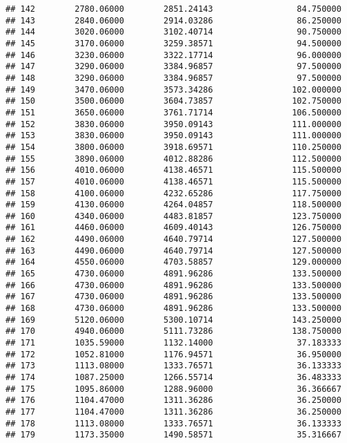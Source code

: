 \documentclass[]{article}
\begin{document}
\begin{verbatim}
## 142        2780.06000        2851.24143                 84.750000
## 143        2840.06000        2914.03286                 86.250000
## 144        3020.06000        3102.40714                 90.750000
## 145        3170.06000        3259.38571                 94.500000
## 146        3230.06000        3322.17714                 96.000000
## 147        3290.06000        3384.96857                 97.500000
## 148        3290.06000        3384.96857                 97.500000
## 149        3470.06000        3573.34286                102.000000
## 150        3500.06000        3604.73857                102.750000
## 151        3650.06000        3761.71714                106.500000
## 152        3830.06000        3950.09143                111.000000
## 153        3830.06000        3950.09143                111.000000
## 154        3800.06000        3918.69571                110.250000
## 155        3890.06000        4012.88286                112.500000
## 156        4010.06000        4138.46571                115.500000
## 157        4010.06000        4138.46571                115.500000
## 158        4100.06000        4232.65286                117.750000
## 159        4130.06000        4264.04857                118.500000
## 160        4340.06000        4483.81857                123.750000
## 161        4460.06000        4609.40143                126.750000
## 162        4490.06000        4640.79714                127.500000
## 163        4490.06000        4640.79714                127.500000
## 164        4550.06000        4703.58857                129.000000
## 165        4730.06000        4891.96286                133.500000
## 166        4730.06000        4891.96286                133.500000
## 167        4730.06000        4891.96286                133.500000
## 168        4730.06000        4891.96286                133.500000
## 169        5120.06000        5300.10714                143.250000
## 170        4940.06000        5111.73286                138.750000
## 171        1035.59000        1132.14000                 37.183333
## 172        1052.81000        1176.94571                 36.950000
## 173        1113.08000        1333.76571                 36.133333
## 174        1087.25000        1266.55714                 36.483333
## 175        1095.86000        1288.96000                 36.366667
## 176        1104.47000        1311.36286                 36.250000
## 177        1104.47000        1311.36286                 36.250000
## 178        1113.08000        1333.76571                 36.133333
## 179        1173.35000        1490.58571                 35.316667

\end{verbatim}
\end{document}
